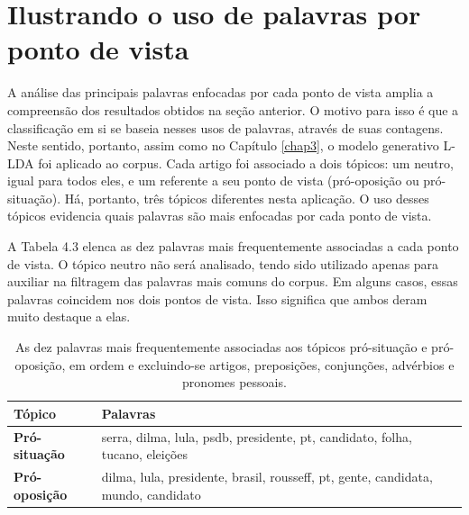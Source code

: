 




\section{Ilustrando o uso de palavras por ponto de vista}
\label{estudo:sec3}

A análise das principais palavras enfocadas por cada ponto de vista amplia a compreensão dos resultados obtidos na seção anterior. O motivo para isso é  que a classificação em si se baseia nesses usos de palavras, através de suas contagens. Neste sentido, portanto, assim como no Capítulo \ref{chap3}, o modelo generativo L-LDA foi aplicado ao corpus. Cada artigo foi associado a dois tópicos: um neutro, igual para todos eles, e um referente a seu ponto de vista (pró-oposição ou pró-situação). Há, portanto, três tópicos diferentes nesta aplicação. O uso desses tópicos evidencia quais palavras são mais enfocadas por cada ponto de vista. %

A Tabela 4.3 elenca as dez palavras mais frequentemente associadas a cada ponto de vista. O tópico neutro não será analisado, tendo sido utilizado apenas para auxiliar na filtragem das palavras mais comuns do corpus. Em alguns casos, essas palavras coincidem nos dois pontos de vista. Isso significa que ambos deram muito destaque a elas.



\begin{table}[h]
\centering
\begin{tabular}{| l | p{10cm} | }
\hline
\textbf{Tópico} & \textbf{Palavras} \\ \hline
\textbf{Pró-situação} & serra, dilma, lula, psdb, presidente, pt, candidato, folha, tucano, eleições\\ \hline
\textbf{Pró-oposição} & dilma, lula, presidente, brasil, rousseff, pt, gente, candidata, mundo, candidato \\ \hline
\end{tabular}
\label{tab:palavras}
\caption{As dez palavras mais frequentemente associadas aos tópicos pró-situação e pró-oposição, em ordem e excluindo-se artigos, preposições, conjunções, advérbios e pronomes pessoais.}
\end{table}

